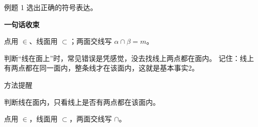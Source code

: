 \documentclass{exam-zh}
\begin{document}
\begin{eduSubQuestionItem}{例题 1}
选出正确的符号表达。\end{eduSubQuestionItem}

\begin{eduDualExplain}
  \begin{eduExplainLeft}
  \end{eduExplainLeft}

  \begin{eduExplainRight}
    \vspace{1mm}
    {\color{edu-blue}\bfseries\small 一句话收束}\par\vspace{1mm}
    \begin{eduBulletList}
      \item 点用 $\in$、线面用 $\subset$；两面交线写 $\alpha\cap\beta=m$。    \end{eduBulletList}
  \end{eduExplainRight}
\end{eduDualExplain}




\begin{eduMistakeBox}
判断“线在面上”时，常见错误是凭感觉，没去找线上两点都在面内。
记住：线上有两点都在同一面内，整条线才在该面内，这就是基本事实2。
\end{eduMistakeBox}




\begin{eduSummaryBlock}{\eduIconPin}{方法提醒}
\begin{eduBulletList}
  \item 判断线在面内，只看线上是否有两点都在该面内。  \item 点用 $\in$，线面用 $\subset$，两面交线写 $\cap$。\end{eduBulletList}
\end{eduSummaryBlock}
\end{document}
